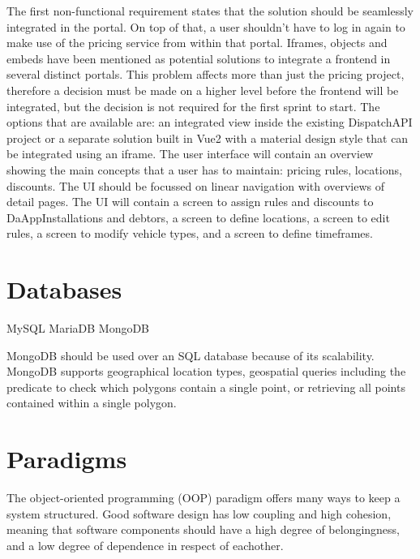 The first non-functional requirement states that the solution should be seamlessly integrated in the portal. On top of that, a user shouldn’t have to log in again to make use of the pricing service from within that portal. Iframes, objects and embeds have been mentioned as potential solutions to integrate a frontend in several distinct portals. This problem affects more than just the pricing project, therefore a decision must be made on a higher level before the frontend will be integrated, but the decision is not required for the first sprint to start. The options that are available are: an integrated view inside the existing DispatchAPI project or a separate solution built in Vue2 with a material design style that can be integrated using an iframe. The user interface will contain an overview showing the main concepts that a user has to maintain: pricing rules, locations, discounts. The UI should be focussed on linear navigation with overviews of detail pages. The UI will contain a screen to assign rules and discounts to DaAppInstallations and debtors, a screen to define locations, a screen to edit rules, a screen to modify vehicle types, and a screen to define timeframes.

%
\section{Databases}
MySQL
MariaDB
MongoDB

MongoDB should be used over an SQL database because of its scalability. MongoDB supports geographical location types, geospatial queries including the predicate to check which polygons contain a single point, or retrieving all points contained within a single polygon.

%
\section{Paradigms}
The object-oriented programming (OOP) paradigm offers many ways to keep a system structured. Good software design has low coupling and high cohesion, meaning that software components should have a high degree of belongingness, and a low degree of dependence in respect of eachother.


